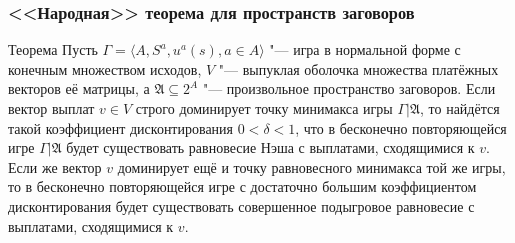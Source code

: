 \begin{frame}
	\frametitle{<<Народная>> теорема для пространств заговоров}
	\begin{block}{Теорема}
		Пусть $\Gamma = \langle A, S^a, u^a(s), a \in A \rangle$ "--- игра в нормальной форме с конечным множеством исходов, $V$ "--- выпуклая оболочка множества платёжных векторов её матрицы, а $\mathfrak{A} \subseteq 2^A$ "--- произвольное пространство заговоров. Если вектор выплат $v \in V$ строго доминирует точку минимакса игры $\Gamma | \mathfrak{A}$, то найдётся такой коэффициент дисконтирования $0 < \delta < 1$, что в бесконечно повторяющейся игре $\Gamma | \mathfrak{A}$ будет существовать равновесие Нэша с выплатами, сходящимися к $v$. Если же вектор $v$ доминирует ещё и точку равновесного минимакса той же игры, то в бесконечно повторяющейся игре с достаточно большим коэффициентом дисконтирования будет существовать совершенное подыгровое равновесие с выплатами, сходящимися к $v$.
	\end{block}
\end{frame}

